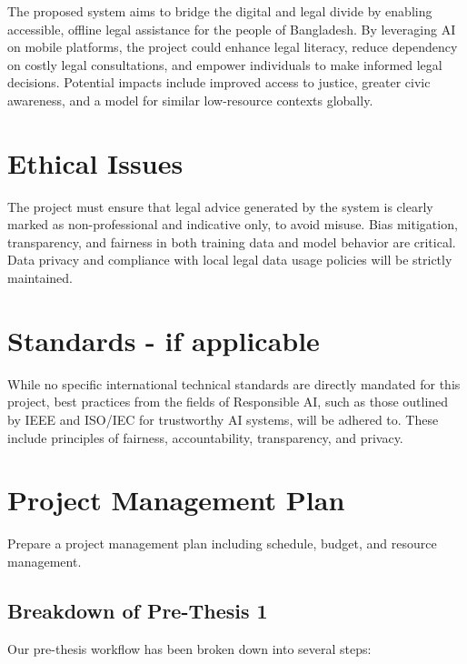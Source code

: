 The proposed system aims to bridge the digital and legal divide by enabling accessible, offline legal assistance for the people of Bangladesh. By leveraging AI on mobile platforms, the project could enhance legal literacy, reduce dependency on costly legal consultations, and empower individuals to make informed legal decisions. Potential impacts include improved access to justice, greater civic awareness, and a model for similar low-resource contexts globally.




\section{Ethical Issues}
The project must ensure that legal advice generated by the system is clearly marked as non-professional and indicative only, to avoid misuse. Bias mitigation, transparency, and fairness in both training data and model behavior are critical. Data privacy and compliance with local legal data usage policies will be strictly maintained.

\section{Standards - if applicable}

While no specific international technical standards are directly mandated for this project, best practices from the fields of Responsible AI, such as those outlined by IEEE and ISO/IEC for trustworthy AI systems, will be adhered to. These include principles of fairness, accountability, transparency, and privacy.

\section{Project Management Plan}
Prepare a project management plan including schedule, budget, and resource management.

\subsection{Breakdown of Pre-Thesis 1}

Our pre-thesis workflow has been broken down into several steps:

